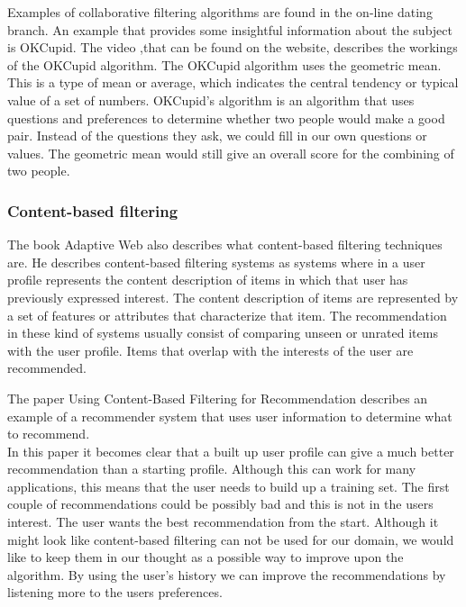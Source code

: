 \documentclass[]{article}
\begin{document}
Examples of collaborative filtering algorithms are found in the on-line dating branch.
An example that provides some insightful information about the subject is OKCupid.
The video ,that can be found on the website\cite{okcupid}, describes the workings of the OKCupid algorithm.
The OKCupid algorithm uses the geometric mean.
This is a type of mean or average, which indicates the central tendency or typical value of a set of numbers.
OKCupid's algorithm is an algorithm that uses questions and preferences to determine whether two people would make a good pair.
Instead of the questions they ask, we could fill in our own questions or values.
The geometric mean would still give an overall score for the combining of two people.\\

\subsubsection{Content-based filtering}
The book Adaptive Web \citep{Peter2007} also describes what content-based filtering techniques are.
He describes content-based filtering systems as systems where in a user profile represents the content description of items in which that user has previously expressed interest.
The content description of items are represented by a set of features or attributes that characterize that item.
The recommendation in these kind of systems usually consist of comparing unseen or unrated items with the user profile.
Items that overlap with the interests of the user are recommended.

The paper Using Content-Based Filtering for Recommendation \cite{van2000using} describes an example of a recommender system that uses user information to determine what to recommend.\\
In this paper it becomes clear that a built up user profile can give a much better recommendation than a starting profile.
Although this can work for many applications, this means that the user needs to build up a training set.
The first couple of recommendations could be possibly bad and this is not in the users interest.
The user wants the best recommendation from the start.
Although it might look like content-based filtering can not be used for our domain, we would like to keep them in our thought as a possible way to improve upon the algorithm.
By using the user's history we can improve the recommendations by listening more to the users preferences.
\end{document}
